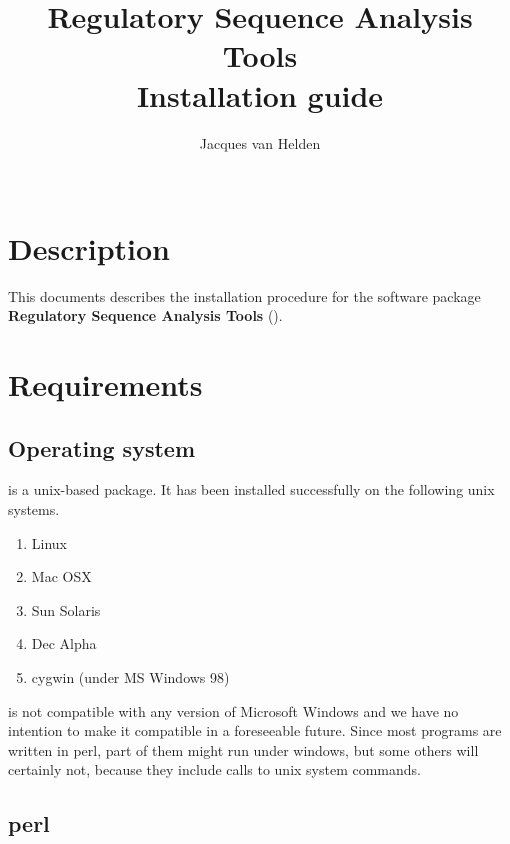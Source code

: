 \documentclass{article}
\begin{document}
\title{Regulatory Sequence Analysis Tools \\
Installation guide}

\author{
	Jacques van Helden \\
	 \\
	\scmb 
}



\maketitle


\section{Description}

This documents describes the installation procedure for the software
package \textbf{Regulatory Sequence Analysis Tools} (\RSAT).

\section{Requirements}

\subsection{Operating system}

\RSAT is a unix-based package. It has been installed successfully on
the following unix systems.

\begin{enumerate}
\item Linux
\item Mac OSX
\item Sun Solaris
\item Dec Alpha
\item cygwin (under MS Windows 98)
\end{enumerate}

\RSAT is not compatible with any version of Microsoft Windows and we
have no intention to make it compatible in a foreseeable future. Since
most programs are written in perl, part of them might run under
windows, but some others will certainly not, because they include
calls to unix system commands.

\subsection{perl}
\end{document}
